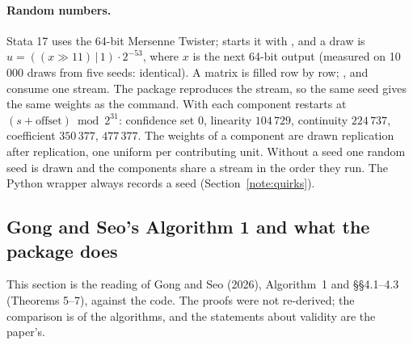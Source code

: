 \documentclass[
  10.5pt,
  a4paper,
]{article}
\begin{document}
\paragraph{Random numbers.} Stata 17 uses the 64-bit Mersenne Twister;  starts it with
, and a draw is $u=((x\gg11)\,|\,1)\cdot2^{-53}$, where $x$ is the next 64-bit output
(measured on 10\,000 draws from five seeds: identical). A matrix is filled row by row;
,  and  consume one stream. The package reproduces
the stream, so the same seed gives the same weights as the command. With  each component restarts
at $(s+\text{offset})\bmod2^{31}$: confidence set $0$, linearity $104\,729$, continuity $224\,737$, coefficient
$350\,377$,  $477\,377$. The weights of a component are drawn replication after replication,
one uniform per contributing unit. Without a seed one random seed is drawn and the components share a
stream in the order they run. The Python wrapper always records a seed (Section~\ref{note:quirks}).

\subsection{Gong and Seo's Algorithm 1 and what the package does}\label{note:gs}

This section is the reading of Gong and Seo (2026), Algorithm~1 and \S\S4.1--4.3 (Theorems 5--7), against the code.
The proofs were not re-derived; the comparison is of the algorithms, and the statements about validity are the
paper's.
\end{document}
